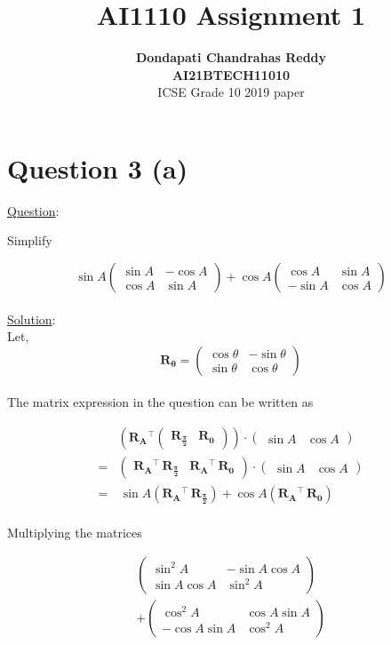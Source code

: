 \documentclass[journal,12pt,twocolumn]{IEEEtran}
\newcommand{\myvec}[1]{\ensuremath{\begin{pmatrix}#1\end{pmatrix}}}
\let\vec\mathbf
\begin{document}
\title{\textbf{AI1110 Assignment 1} }
\author{\textbf{Dondapati Chandrahas Reddy}\\ \textbf{AI21BTECH11010}\\ ICSE Grade 10 2019 paper}

\maketitle

\section {Question 3 (a) \newline}

{\large \underline{Question}:\newline}

Simplify

\begin{equation}
	\sin A\myvec{\sin A &  -\cos A \\ \cos A & \sin A} + \cos A \myvec{\cos A &  \sin A \\ -\sin A & \cos A}
\end{equation}\\

{\large \underline{Solution}:}\\

Let,
\begin{equation}
	\vec{R_\theta} = \myvec{\cos \theta &  -\sin \theta \\ \sin \theta & \cos \theta}
\end{equation}\\

The matrix expression in the question can be written as

\begin{align}
	&\left(\vec{R_A}\!^\top \myvec{\vec{R_{\frac{\pi}{2}}} & \vec{R_0}}\right) \cdot \myvec{\sin A & \cos A} \\[1em]
	=& \myvec{\vec{R_A}\!^\top \, \vec{R_{\frac{\pi}{2}}} & \vec{R_A}\!^\top \, \vec{R_0}} \cdot \myvec{\sin A & \cos A} \\[1em]
	=& \, \sin A \left(\vec{R_A}\!^\top \, \vec{R_{\frac{\pi}{2}}}\right) + \cos A \left( \vec{R_A}\!^\top \, \vec{R_0}\right)
\end{align}\\

Multiplying the matrices

\begin{multline}
	\myvec{\sin^2 A &  -\sin A\cos A \\ \sin A\cos A & \sin^2 A} \\ 
	+ \myvec{\cos^2 A & \cos A\sin A \\ -\cos A\sin A & \cos^2 A}
\end{multline}\\\\
\end{document}
